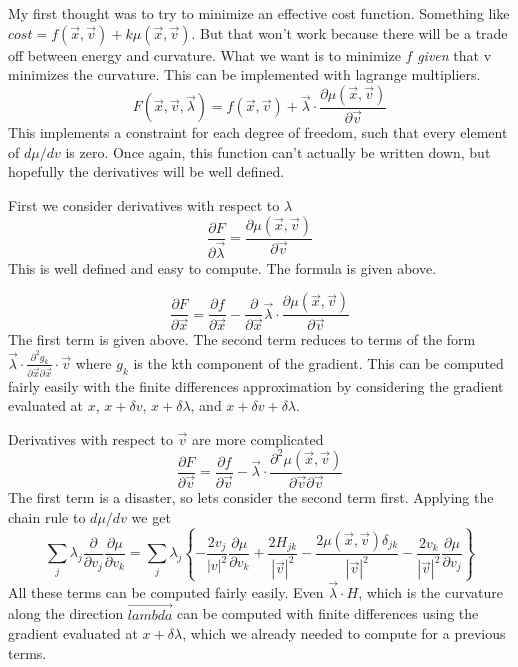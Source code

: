 \documentclass[a4paper]{article}
\begin{document}
My first thought was to try to minimize an effective cost function.  Something like $cost = f(\vec{x}, \vec{v}) + k \mu(\vec{x}, \vec{v})$.
But that won't work because there will be a trade off between energy and curvature.  What we want is to minimize $f$ \emph{given} that v
minimizes the curvature.  This can be implemented with lagrange multipliers.
\begin{equation}
F(\vec{x}, \vec{v}, \vec{\lambda}) = f(\vec{x}, \vec{v}) + \vec{\lambda} \cdot \frac{\partial \mu(\vec{x}, \vec{v})}{\partial \vec{v}}
\end{equation}
This implements a constraint for each degree of freedom, such that every element of $d\mu /dv$ is zero.
Once again, this function can't actually be written down, but hopefully the derivatives will be well defined.

First we consider derivatives with respect to $\lambda$
\begin{equation}
\frac{\partial F}{\partial \vec{\lambda}} = \frac{\partial \mu(\vec{x}, \vec{v})}{\partial \vec{v}}
\end{equation}
This is well defined and easy to compute.  The formula is given above.  


\begin{equation}
\frac{\partial F}{\partial \vec{x}} = \frac{\partial f}{\partial \vec{x}} -
\frac{\partial}{\partial \vec{x}} \vec{\lambda} \cdot \frac{\partial
\mu(\vec{x}, \vec{v})}{\partial \vec{v}}
\end{equation}
The first term is given above.  The second term reduces to terms of the form
$\vec{\lambda} \cdot \frac{\partial^2 g_k}{\partial \vec{x} \partial \vec{x}} \cdot \vec{v}$ where $g_k$ is the kth component
of the gradient.  This can be computed fairly easily
with the finite differences approximation by considering the gradient evaluated at 
$x$,
$x+\delta v$,
$x+\delta \lambda$, and
$x+\delta v + \delta \lambda$.

Derivatives with respect to $\vec{v}$ are more complicated
\begin{equation}
\frac{\partial F}{\partial \vec{v}} = \frac{\partial f}{\partial \vec{v}} -
\vec{\lambda} \cdot \frac{\partial^2
\mu(\vec{x}, \vec{v})}{\partial \vec{v} \partial \vec{v}}
\end{equation}
The first term is a disaster, so lets consider the second term first.  Applying the chain rule
to $d\mu / dv$ we get
\begin{equation}
\sum_j \lambda_j \frac{\partial }{\partial v_j }
\frac{\partial \mu}{\partial v_k}
= 
\sum_j \lambda_j \left\{
-\frac{2 v_j}{|v|^2} \frac{\partial \mu}{\partial v_k}
+
\frac{ 2 H_{jk}}{|\vec{v}|^2}
-
\frac{2 \mu(\vec{x}, \vec{v}) \delta_{jk}}{|\vec{v}|^2}
-
\frac{2  v_k}{|\vec{v}|^2} \frac{\partial \mu}{\partial v_j}
\right\}
\end{equation}
All these terms can be computed fairly easily.  Even $\vec{\lambda} \cdot H$, which is the curvature along the direction $\vec{lambda}$ can be computed
with finite differences using the gradient evaluated at 
$x+\delta \lambda$, which we already needed to compute for a previous terms.
\end{document}

